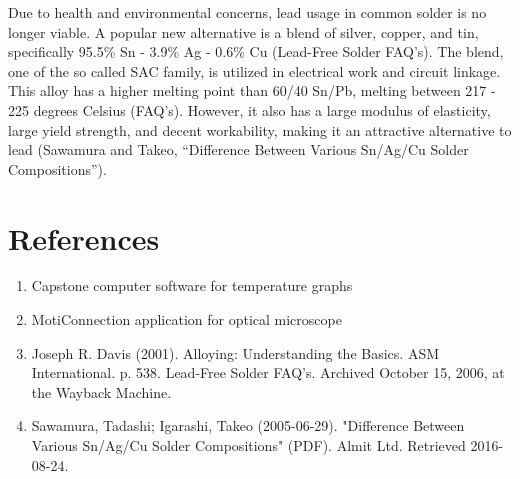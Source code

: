 \documentclass{article}
\begin{document}
\begin{enumerate}
Due to health and environmental concerns, lead usage in common solder is no longer viable. A popular new alternative is a blend of silver, copper, and tin, specifically 95.5\% Sn - 3.9\% Ag - 0.6\% Cu (Lead-Free Solder FAQ’s). The blend, one of the so called SAC family, is utilized in electrical work and circuit linkage. This alloy has a higher melting point than 60/40 Sn/Pb, melting between 217 - 225 degrees Celsius (FAQ’s). However, it also has a large modulus of elasticity, large yield strength, and decent workability, making it an attractive alternative to lead (Sawamura and Takeo, “Difference Between Various Sn/Ag/Cu Solder Compositions”).

\end{enumerate}

\section{References}
\begin{enumerate}
\item Capstone computer software for temperature graphs
\item MotiConnection application for optical microscope
\item Joseph R. Davis (2001). Alloying: Understanding the Basics. ASM International. p. 538.
Lead-Free Solder FAQ’s. Archived October 15, 2006, at the Wayback Machine.
\item Sawamura, Tadashi; Igarashi, Takeo (2005-06-29). "Difference Between Various Sn/Ag/Cu 
Solder Compositions" (PDF). Almit Ltd. Retrieved 2016-08-24.

\end{enumerate}
\end{document}
